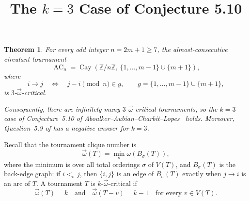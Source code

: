 \documentclass[11pt]{article}
\title{The \(k=3\) Case of Conjecture 5.10}
\author{}
\date{}
\newtheorem{theorem}{Theorem}
\newcommand{\Z}{\mathbb{Z}}
\newcommand{\tomega}{\vec{\omega}}
\newcommand{\AC}{\operatorname{AC}}
\newcommand{\Cay}{\operatorname{Cay}}
\begin{document}
\maketitle

\begin{theorem}
For every odd integer \(n=2m+1\geq 7\), the almost-consecutive
circulant tournament
\[
  \AC_n
  =
  \Cay\!\left(
    \Z/n\Z,\,
    \{1,\ldots,m-1\}\cup\{m+1\}
  \right),
\]
where
\[
  i\longrightarrow j
  \quad\Longleftrightarrow\quad
  j-i\pmod n\in g,
  \qquad
  g=\{1,\ldots,m-1\}\cup\{m+1\},
\]
is \(3\)-\(\tomega\)-critical.

Consequently, there are infinitely many \(3\)-\(\tomega\)-critical
tournaments, so the \(k=3\) case of Conjecture~5.10 of
Aboulker--Aubian--Charbit--Lopes~\cite{AACL} holds. Moreover,
Question~5.9 of \cite{AACL} has a negative answer for \(k=3\).
\end{theorem}

Recall that the tournament clique number is
\[
  \tomega(T)
  =
  \min_{\sigma}
  \omega\!\left(B_{\sigma}(T)\right),
\]
where the minimum is over all total orderings \(\sigma\) of \(V(T)\),
and \(B_{\sigma}(T)\) is the back-edge graph: if
\(i<_{\sigma}j\), then \(\{i,j\}\) is an edge of
\(B_{\sigma}(T)\) exactly when \(j\to i\) is an arc of \(T\).
A tournament \(T\) is \(k\)-\(\tomega\)-critical if
\[
  \tomega(T)=k
  \quad\text{and}\quad
  \tomega(T-v)=k-1
  \quad\text{for every }v\in V(T).
\]
\end{document}
